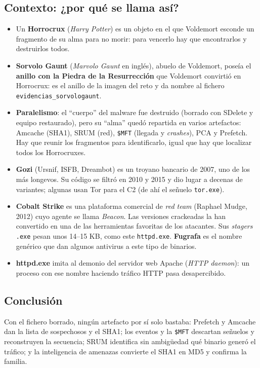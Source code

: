 \documentclass[11pt,a4paper]{article}
\begin{document}
\subsection{Contexto: ¿por qué se llama así?}
\begin{itemize}
  \item Un \textbf{Horrocrux} (\emph{Harry Potter}) es un objeto en el que Voldemort esconde un fragmento de su alma
        para no morir: para vencerlo hay que encontrarlos y destruirlos todos.
  \item \textbf{Sorvolo Gaunt} (\emph{Marvolo Gaunt} en inglés), abuelo de Voldemort, poseía el \textbf{anillo con la
        Piedra de la Resurrección} que Voldemort convirtió en Horrocrux: es el anillo de la imagen del reto y da nombre
        al fichero \texttt{evidencias\_sorvologaunt}.
  \item \textbf{Paralelismo}: el ``cuerpo'' del malware fue destruido (borrado con SDelete y equipo restaurado), pero su
        ``alma'' quedó repartida en varios artefactos: Amcache (SHA1), SRUM (red), \texttt{\$MFT} (llegada y
        \emph{crashes}), PCA y Prefetch. Hay que reunir los fragmentos para identificarlo, igual que hay que localizar
        todos los Horrocruxes.
  \item \textbf{Gozi} (Ursnif, ISFB, Dreambot) es un troyano bancario de 2007, uno de los más longevos. Su código se
        filtró en 2010 y 2015 y dio lugar a decenas de variantes; algunas usan Tor para el C2 (de ahí el señuelo
        \texttt{tor.exe}).
  \item \textbf{Cobalt Strike} es una plataforma comercial de \emph{red team} (Raphael Mudge, 2012) cuyo agente se llama
        \emph{Beacon}. Las versiones crackeadas la han convertido en una de las herramientas favoritas de los atacantes.
        Sus \emph{stagers} \texttt{.exe} pesan unos 14--15 KB, como este \texttt{httpd.exe}. \textbf{Fugrafa} es el
        nombre genérico que dan algunos antivirus a este tipo de binarios.
  \item \textbf{httpd.exe} imita al demonio del servidor web Apache (\emph{HTTP daemon}): un proceso con ese nombre
        haciendo tráfico HTTP pasa desapercibido.
\end{itemize}

\subsection{Conclusión}
Con el fichero borrado, ningún artefacto por sí solo bastaba: Prefetch y Amcache dan la lista de sospechosos y el
SHA1; los eventos y la \texttt{\$MFT} descartan señuelos y reconstruyen la secuencia; SRUM identifica sin ambigüedad
qué binario generó el tráfico; y la inteligencia de amenazas convierte el SHA1 en MD5 y confirma la familia.
\end{document}
